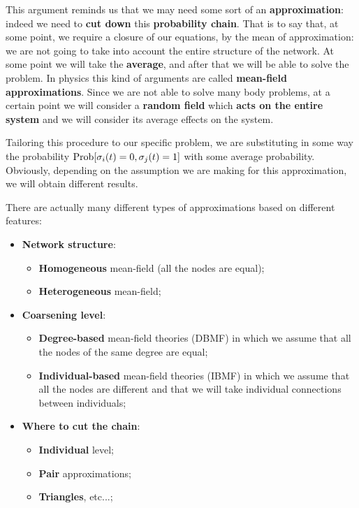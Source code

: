 \documentclass[../main/main.tex]{subfiles}
\begin{document}
This argument reminds us that we may need some sort of an \textbf{approximation}: indeed we need to \textbf{cut down} this \textbf{probability chain}. That is to say that, at some point, we require a closure of our equations, by the mean of approximation: we are not going to take into account the entire structure of the network. At some point we will take the \textbf{average}, and after that we will be able to solve the problem.
In physics this kind of arguments are called \textbf{mean-field approximations}. Since we are not able to solve many body problems, at a certain point we will consider a \textbf{random field} which \textbf{acts on the entire system} and we will consider its average effects on the system.

Tailoring this procedure to our specific problem, we are substituting in some way the probability \( \text{Prob} \qty[\sigma _i (t) = 0, \sigma _j (t ) =1 ]  \) with some average probability. Obviously, depending on the assumption we are making for this approximation, we will obtain different results.

There are actually many different types of approximations based on different features:
\begin{itemize}
\item \textbf{Network structure}:
    \begin{itemize}
    \item \textbf{Homogeneous} mean-field (all the nodes are equal);
    \item \textbf{Heterogeneous} mean-field;
    \end{itemize}
\item \textbf{Coarsening level}:
    \begin{itemize}
    \item \textbf{Degree-based} mean-field theories (DBMF) in which we assume that all the nodes of the same degree are equal;
    \item \textbf{Individual-based} mean-field theories (IBMF) in which we assume that all the nodes are different and that we will take individual connections between individuals;
    \end{itemize}
\item \textbf{Where to cut the chain}:
    \begin{itemize}
    \item \textbf{Individual} level;
    \item \textbf{Pair} approximations;
    \item \textbf{Triangles}, etc...;
    \end{itemize}
\end{itemize}
\end{document}
